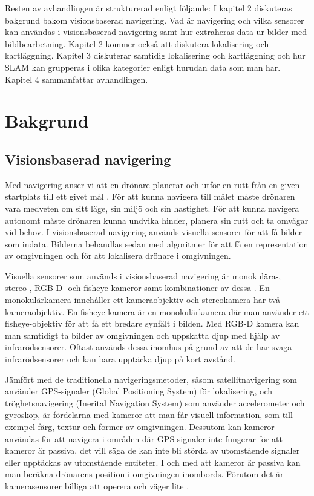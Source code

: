 Resten av avhandlingen är strukturerad enligt följande: I kapitel 2 diskuteras bakgrund bakom visionsbaserad navigering. Vad är navigering och vilka sensorer kan användas i visionsbaserad navigering samt hur extraheras data ur bilder med bildbearbetning. Kapitel 2 kommer också att diskutera lokalisering och kartläggning. Kapitel 3 diskuterar samtidig lokalisering och kartläggning och hur SLAM kan grupperas i olika kategorier enligt hurudan data som man har. Kapitel 4 sammanfattar avhandlingen.

\chapter{Bakgrund}

\section{Visionsbaserad navigering}

Med navigering anser vi att en drönare planerar och utför en rutt från en given startplats till ett givet mål \citep{geospatial}. För att kunna navigera till målet måste drönaren vara medveten om sitt läge, sin miljö och sin hastighet. För att kunna navigera autonomt måste drönaren kunna undvika hinder, planera sin rutt och ta omvägar vid behov. I visionsbaserad navigering används visuella sensorer för att få bilder som indata. Bilderna behandlas sedan med algoritmer för att få en representation av omgivningen och för att lokalisera drönare i omgivningen. 

Visuella sensorer som används i visionsbaserad navigering är monokulära-, stereo-, RGB-D- och fisheye-kameror samt kombinationer av dessa \citep{geospatial}. En monokulärkamera innehåller ett kameraobjektiv och stereokamera har två kameraobjektiv. En fisheye-kamera är en monokulärkamera där man använder ett fisheye-objektiv för att få ett bredare synfält i bilden. Med RGB-D kamera kan man samtidigt ta bilder av omgivningen och uppskatta djup med hjälp av infrarödsensorer. Oftast används dessa inomhus på grund av att de har svaga infrarödsensorer och kan bara upptäcka djup på kort avstånd. 

Jämfört med de traditionella navigeringsmetoder, såsom satellitnavigering som använder GPS-signaler (Global Positioning System) för lokalisering, och tröghetsnavigering (Inerital Navigation System) som använder accelerometer och gyroskop, är fördelarna med kameror att man får visuell information, som till exempel färg, textur och former av omgivningen. Dessutom kan kameror användas för att navigera i områden där GPS-signaler inte fungerar för att kameror är passiva, det vill säga de kan inte bli störda av utomstående signaler eller upptäckas av utomstående entiteter. I och med att kameror är passiva kan man beräkna drönarens position i omgivningen inombords. Förutom det är kamerasensorer billiga att operera och väger lite \citep{opticalflowuav,geospatial}.

